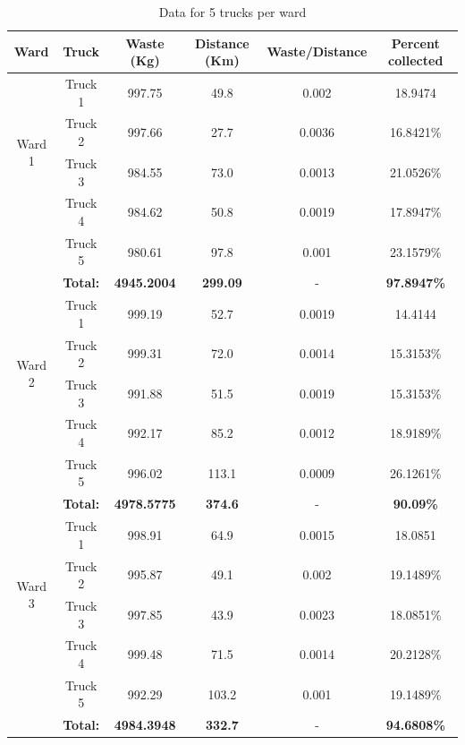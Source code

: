 \documentclass[12pt]{article}
\begin{document}
\begin{table}[H]
    \centering
    \caption{ Data for 5 trucks per ward} \label{tab3}
    \vspace*{0.3cm}
    \begin{tabular}{|c|c|c|c|c|c|}
        \hline Ward & Truck & Waste (Kg) & Distance (Km) & Waste/Distance & Percent collected \\
        \hline \multirow{4}{*}{Ward 1} & Truck 1 &997.75  &49.8  &0.002  &18.9474 \\
        \cline{2-6}& Truck 2 &997.66&27.7&0.0036&16.8421\%\\        
        \cline{2-6}& Truck 3 &984.55&73.0&0.0013&21.0526\%\\        
        \cline{2-6}& Truck 4 &984.62&50.8&0.0019&17.8947\%\\
        \cline{2-6}& Truck 5 &980.61&97.8&0.001&23.1579\%\\
        \hline &\textbf{Total:} &\textbf{4945.2004} &\textbf{299.09} &- &\textbf{97.8947\%}\\
        \hline \multirow{4}{*}{Ward 2} & Truck 1 &999.19  &52.7  &0.0019  &14.4144 \\
        \cline{2-6}& Truck 2 &999.31&72.0&0.0014&15.3153\%\\        
        \cline{2-6}& Truck 3 &991.88&51.5&0.0019&15.3153\%\\        
        \cline{2-6}& Truck 4 &992.17&85.2&0.0012&18.9189\%\\      
        \cline{2-6}& Truck 5 &996.02&113.1&0.0009&26.1261\%\\
        \hline &\textbf{Total:} &\textbf{4978.5775} &\textbf{374.6} &- &\textbf{90.09\%}\\     
        \hline \multirow{4}{*}{Ward 3} & Truck 1 &998.91  &64.9  &0.0015  &18.0851 \\
        \cline{2-6}& Truck 2 &995.87&49.1&0.002&19.1489\%\\        
        \cline{2-6}& Truck 3 &997.85&43.9&0.0023&18.0851\%\\        
        \cline{2-6}& Truck 4 &999.48&71.5&0.0014&20.2128\%\\
        \cline{2-6}& Truck 5 &992.29&103.2&0.001&19.1489\%\\
        \hline &\textbf{Total:} &\textbf{4984.3948} &\textbf{332.7}&- &\textbf{94.6808\%}\\
        \hline      
    \end{tabular}
\end{table}
\end{document}
